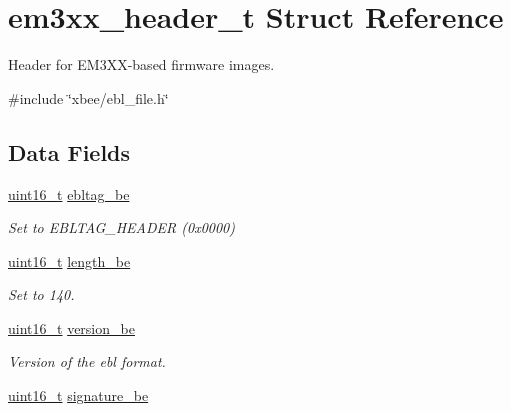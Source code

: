 \hypertarget{structem3xx__header__t}{\section{em3xx\-\_\-header\-\_\-t Struct Reference}
\label{structem3xx__header__t}
}


Header for E\-M3\-X\-X-\/based firmware images.  




{\ttfamily \#include \char`\"{}xbee/ebl\-\_\-file.\-h\char`\"{}}

\subsection*{Data Fields}
\begin{DoxyCompactItemize}
\item 
\hypertarget{structem3xx__header__t_a7de4514a713d8a42dd9d4749d775a0ef}{\hyperlink{group__hal_ga5a8b2dc9e45a9ee81a94ef304fb62505}{uint16\-\_\-t} \hyperlink{structem3xx__header__t_a7de4514a713d8a42dd9d4749d775a0ef}{ebltag\-\_\-be}}\label{structem3xx__header__t_a7de4514a713d8a42dd9d4749d775a0ef}

\begin{DoxyCompactList}\small\item\em Set to E\-B\-L\-T\-A\-G\-\_\-\-H\-E\-A\-D\-E\-R (0x0000) \end{DoxyCompactList}\item 
\hypertarget{structem3xx__header__t_a44c1c906129a1b8f619154f42c31d706}{\hyperlink{group__hal_ga5a8b2dc9e45a9ee81a94ef304fb62505}{uint16\-\_\-t} \hyperlink{structem3xx__header__t_a44c1c906129a1b8f619154f42c31d706}{length\-\_\-be}}\label{structem3xx__header__t_a44c1c906129a1b8f619154f42c31d706}

\begin{DoxyCompactList}\small\item\em Set to 140. \end{DoxyCompactList}\item 
\hypertarget{structem3xx__header__t_a47c27db5c7ed6378e2345c0781bd140d}{\hyperlink{group__hal_ga5a8b2dc9e45a9ee81a94ef304fb62505}{uint16\-\_\-t} \hyperlink{structem3xx__header__t_a47c27db5c7ed6378e2345c0781bd140d}{version\-\_\-be}}\label{structem3xx__header__t_a47c27db5c7ed6378e2345c0781bd140d}

\begin{DoxyCompactList}\small\item\em Version of the ebl format. \end{DoxyCompactList}\item 
\hypertarget{structem3xx__header__t_ab20e78cfd004b348162a62ebe3689514}{\hyperlink{group__hal_ga5a8b2dc9e45a9ee81a94ef304fb62505}{uint16\-\_\-t} \hyperlink{structem3xx__header__t_ab20e78cfd004b348162a62ebe3689514}{signature\-\_\-be}}\label{structem3xx__header__t_ab20e78cfd004b348162a62ebe3689514}


\end{DoxyCompactItemize}
